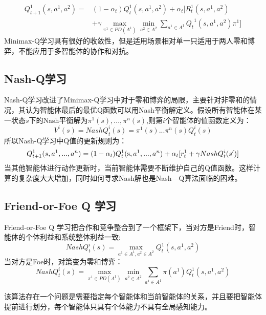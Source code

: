 \begin{equation}
\begin{aligned}
Q_{t + 1}^1(s,{a^1},{a^2}) =& (1 - {\alpha _t})Q_t^1(s,{a^1},{a^2}) + {\alpha _t}[R_t^1(s,{a^1},{a^2}) \\& + \gamma\mathop {\max }\limits_{{\pi ^1} \in PD({A^1})} \mathop {\min }\limits_{{a^2} \in {A^2}} \sum\limits_{{a^1} \in {A^1}} {{Q_t}^1(s,{a^1},{a^2})} {\pi ^1} ]
\end{aligned}
\end{equation}
Minimax-Q学习具有很好的收敛性，但是适用场景相对单一只适用于两人零和博弈，不能应用于多智能体的协作和对抗。
\subsection{Nash-Q学习}
Nash-Q学习改进了Minimax-Q学习中对于零和博弈的局限，主要针对非零和的情况，其认为智能体最后的最优Q函数可以用Nash平衡解定义。假设所有智能体在某一状态$s$下的Nash平衡解为${\pi ^1}(s),...,{\pi ^n}(s)$,则第$i$个智能体的值函数定义为：
\begin{equation}
	{V^i}(s) = NashQ_t^i(s) = {\pi ^1}(s)...{\pi ^n}(s)Q_t^i(s)
\end{equation}
所以Nash-Q学习中Q值的更新规则为：
\begin{equation}
Q_{t + 1}^1(s,{a^1},...,{a^n}) = (1 - {\alpha _t})Q_t^1({\rm{s}},{a^1},...,{a^n}) + {\alpha _t}[r_t^1 + \gamma NashQ_t^i(s')]
\end{equation}
当其他智能体进行动作更新时，当前智能体需要不断维护自己的Q值函数。这样计算的复杂度大大增加，同时如何寻求Nash解也是Nash—Q算法面临的困难。
\subsection{Friend-or-Foe Q 学习}
Friend-or-Foe Q 学习把合作和竞争整合到了一个框架下，当对方是Friend时，智能体的个体利益和系统整体利益一致:
\begin{equation}
NashQ_t^i(s) = \mathop {\max }\limits_{{a^1} \in {A^1},{a^2} \in {A^2}} Q_t^1(s,{a^1},{a^2})
\end{equation}
当对方是Foe时，对策变为零和博弈：
\begin{equation}
	NashQ_t^i(s) = \mathop {\max }\limits_{{\pi ^1} \in PD({A^1})} \mathop {\min }\limits_{{a^2} \in {A^2}} \sum\limits_{{a^1} \in {A^1}} {\pi ({a^1})} Q_t^1(s,{a^1},{a^2})
\end{equation}

该算法存在一个问题是需要指定每个智能体和当前智能体的关系，并且要把智能体提前进行划分，每个智能体只具有个体能力不具有全局感知能力。


